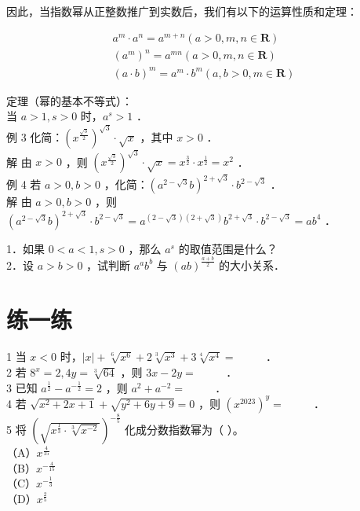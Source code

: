 \documentclass[10pt]{article}
\begin{document}
因此，当指数幂从正整数推广到实数后，我们有以下的运算性质和定理：

\[
\begin{gathered}
a^{m} \cdot a^{n}=a^{m+n}(a>0, m, n \in \mathbf{R}) \\
\left(a^{m}\right)^{n}=a^{m n}(a>0, m, n \in \mathbf{R}) \\
(a \cdot b)^{m}=a^{m} \cdot b^{m}(a, b>0, m \in \mathbf{R})
\end{gathered}
\]

定理（幂的基本不等式）：\\
当 \(a>1, s>0\) 时，\(a^{s}>1\) ．\\
例 3 化简：\(\left(x^{\frac{\sqrt{3}}{2}}\right)^{\sqrt{3}} \cdot \sqrt{x}\) ，其中 \(x>0\) ．\\
解 由 \(x>0\) ，则 \(\left(x^{\frac{\sqrt{3}}{2}}\right)^{\sqrt{3}} \cdot \sqrt{x}=x^{\frac{3}{2}} \cdot x^{\frac{1}{2}}=x^{2}\) ．\\
例 4 若 \(a>0, b>0\) ，化简：\(\left(a^{2-\sqrt{3}} b\right)^{2+\sqrt{3}} \cdot b^{2-\sqrt{3}}\) ．\\
解 由 \(a>0, b>0\) ，则 \(\left(a^{2-\sqrt{3}} b\right)^{2+\sqrt{3}} \cdot b^{2-\sqrt{3}}=a^{(2-\sqrt{3})(2+\sqrt{3})} b^{2+\sqrt{3}} \cdot b^{2-\sqrt{3}}=a b^{4}\) ．

1．如果 \(0<a<1, s>0\) ，那么 \(a^{s}\) 的取值范围是什么？\\
2．设 \(a>b>0\) ，试判断 \(a^{a} b^{b}\) 与 \((a b)^{\frac{a+b}{2}}\) 的大小关系．

\section*{练一练}
1 当 \(x<0\) 时，\(|x|+\sqrt[6]{x^{6}}+2 \sqrt[3]{x^{3}}+3 \sqrt[4]{x^{4}}=\) \(\qquad\) ．\\
2 若 \(8^{x}=2,4 y=\sqrt[3]{64}\) ，则 \(3 x-2 y=\) \(\qquad\) ．\\
3 已知 \(a^{\frac{1}{2}}-a^{-\frac{1}{2}}=2\) ，则 \(a^{2}+a^{-2}=\) \(\qquad\) ．\\
4 若 \(\sqrt{x^{2}+2 x+1}+\sqrt{y^{2}+6 y+9}=0\) ，则 \(\left(x^{2023}\right)^{y}=\) \(\qquad\) ．\\
5 将 \(\left(\sqrt{x^{\frac{1}{3}} \cdot \sqrt[3]{x^{-2}}}\right)^{-\frac{8}{5}}\) 化成分数指数幂为（ ）。\\
（A）\(x^{\frac{4}{15}}\)\\
（B）\(x^{-\frac{4}{15}}\)\\
（C）\(x^{-\frac{1}{3}}\)\\
（D）\(x^{\frac{2}{5}}\)
\end{document}
